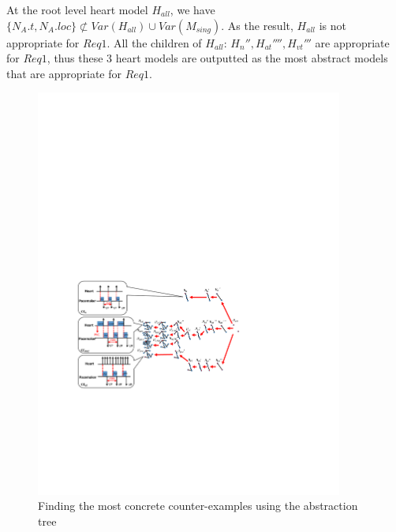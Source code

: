 At the root level heart model $H_{all}$, we have $\{N_A.t,N_A.loc\} \not \subset Var(H_{all})\cup Var(M_{sing})$. As the result, $H_{all}$ is not appropriate for $Req1$. All the children of $H_{all}$: $H_n'',H_{at}'''',H_{vt}'''$ are appropriate for $Req1$,
thus these 3 heart models are outputted as the most abstract models that are appropriate for $Req1$.
\begin{figure}[!t]
	\centering
	\includegraphics[width=0.9\textwidth]{figs/abs_rev.pdf}
	\caption{\small Finding the most concrete counter-examples using the abstraction tree}
	\vspace{-10pt}
	\label{fig:CE}
\end{figure}

